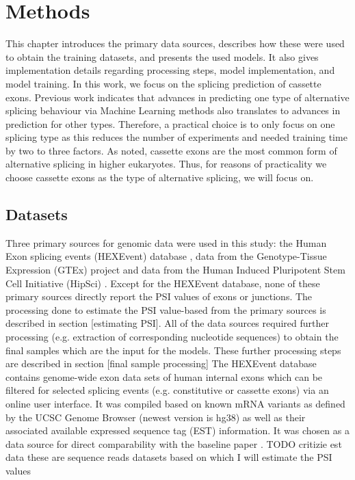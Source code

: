 \chapter{\label{ch:4-methods}Methods}


This chapter introduces the primary data sources, describes how these were used to obtain the training datasets, and presents the used models. It also gives implementation details regarding processing steps, model implementation, and model training.
In this work, we focus on the splicing prediction of cassette exons. Previous work indicates that advances in predicting one type of alternative splicing behaviour via Machine Learning methods also translates to advances in prediction for other types. Therefore, a practical choice is to only focus on one splicing type as this reduces the number of experiments and needed training time by two to three factors. As noted, cassette exons are the most common form of alternative splicing in higher eukaryotes. Thus, for reasons of practicality we choose cassette exons as the type of alternative splicing, we will focus on.
\section{Datasets}\label{sec:datasets}
Three primary sources for genomic data were used in this study: the Human Exon splicing events (HEXEvent) database \cite{hexevent}, data from the Genotype-Tissue Expression (GTEx) project \cite{gtex} and data from the Human Induced Pluripotent Stem Cell Initiative (HipSci) \cite{hipsci}. Except for the HEXEvent database, none of these primary sources directly report the PSI values of exons or junctions. The processing done to estimate the PSI value-based from the primary sources is described in section [estimating PSI]. All of the data sources required further processing (e.g. extraction of corresponding nucleotide sequences) to obtain the final samples which are the input for the models. These further processing steps are described in section [final sample processing]
The HEXEvent database contains genome-wide exon data sets of human internal exons which can be filtered for selected splicing events (e.g. constitutive or cassette exons) via an online user interface. It was compiled based on known mRNA variants as defined by the UCSC Genome Browser (newest version is hg38) as well as their associated available expressed sequence tag (EST) information.
It was chosen as a data source for direct comparability with the baseline paper \cite{dsc}.
TODO critizie est data
these are sequence reads datasets based on which I will estimate the PSI values
